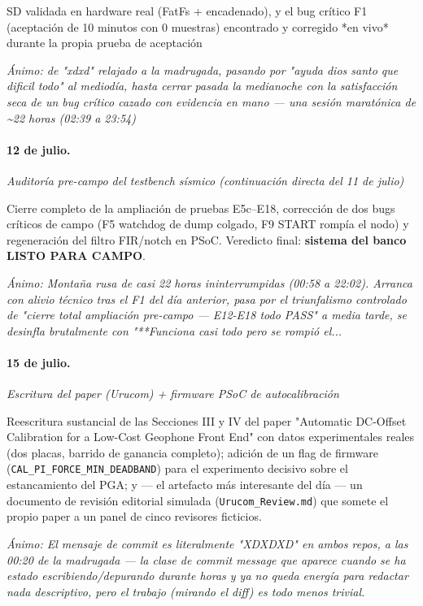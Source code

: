 SD validada en hardware real (FatFs + encadenado), y el bug crítico F1 (aceptación de 10 minutos con 0 muestras) encontrado y corregido *en vivo* durante la propia prueba de aceptación

{\footnotesize\itshape \'Animo: de "xdxd" relajado a la madrugada, pasando por "ayuda dios santo que dificil todo" al mediodía, hasta cerrar pasada la medianoche con la satisfacción seca de un bug crítico cazado con evidencia en mano --- una sesión maratónica de \textasciitilde{}22 horas (02:39 a 23:54)}

\paragraph{12 de julio.}
\emph{Auditoría pre-campo del testbench sísmico (continuación directa del 11 de julio)}

Cierre completo de la ampliación de pruebas E5c--E18, corrección de dos bugs críticos de campo (F5 watchdog de dump colgado, F9 START rompía el nodo) y regeneración del filtro FIR/notch en PSoC. Veredicto final: \textbf{sistema del banco LISTO PARA CAMPO}.

{\footnotesize\itshape \'Animo: Montaña rusa de casi 22 horas ininterrumpidas (00:58 a 22:02). Arranca con alivio técnico tras el F1 del día anterior, pasa por el triunfalismo controlado de "cierre total ampliación pre-campo --- E12-E18 todo PASS" a media tarde, se desinfla brutalmente con "**Funciona casi todo pero se rompió el...}

\paragraph{15 de julio.}
\emph{Escritura del paper (Urucom) + firmware PSoC de autocalibración}

Reescritura sustancial de las Secciones III y IV del paper "Automatic DC-Offset Calibration for a Low-Cost Geophone Front End" con datos experimentales reales (dos placas, barrido de ganancia completo); adición de un flag de firmware (\texttt{CAL\_PI\_FORCE\_MIN\_DEADBAND}) para el experimento decisivo sobre el estancamiento del PGA; y --- el artefacto más interesante del día --- un documento de revisión editorial simulada (\texttt{Urucom\_Review.md}) que somete el propio paper a un panel de cinco revisores ficticios.

{\footnotesize\itshape \'Animo: El mensaje de commit es literalmente "XDXDXD" en ambos repos, a las 00:20 de la madrugada --- la clase de commit message que aparece cuando se ha estado escribiendo/depurando durante horas y ya no queda energía para redactar nada descriptivo, pero el trabajo (mirando el diff) es todo menos trivial.}

